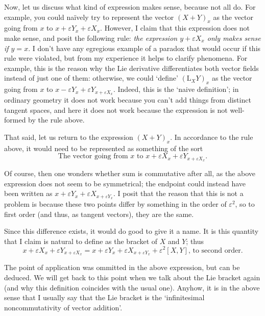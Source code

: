 \documentclass{article}
\theoremstyle{definition}
\newcommand{\Lie}{\mathrm{L}}
\begin{document}
Now, let us discuss what kind of expression makes sense, because not all do. For example, you could naïvely try to represent the vector $(X+Y)_x$ as the vector going from $x$ to $x+\varepsilon Y_x + \varepsilon X_x$. However, I claim that this expression does not make sense, and posit the following rule: \emph{the expression $y + \varepsilon X_x$ only makes sense if $y = x$}. I don't have any egregious example of a paradox that would occur if this rule were violated, but from my experience it helps to clarify phenomena. For example, this is the reason why the Lie derivative differentiates both vector fields instead of just one of them: otherwise, we could `define' $(\Lie_X Y)_x$ as the vector going from $x$ to $x - \varepsilon Y_x + \varepsilon Y_{x + \varepsilon X_x}$. Indeed, this is the `naive definition'; in ordinary geometry it does not work because you can't add things from distinct tangent spaces, and here it does not work because the expression is not well-formed by the rule above.

That said, let us return to the expression $(X+Y)_x$. In accordance to the rule above, it would need to be represented as something of the sort
\begin{equation}
\text{The vector going from } x \text{ to } x + \varepsilon X_x + \varepsilon Y_{x + \varepsilon X_x}.
\end{equation}

Of course, then one wonders whether sum is commutative after all, as the above expression does not seem to be symmetrical; the endpoint could instead have been written as $x + \varepsilon Y_x + \varepsilon X_{x + \varepsilon Y_x}$. I posit that the reason that this is not a problem is because these two points differ by something in the order of $\varepsilon^2$, so to first order (and thus, as tangent vectors), they are the same.

Since this difference exists, it would do good to give it a name. It is this quantity that I claim is natural to define as the bracket of $X$ and $Y$; thus
\begin{equation}\label{eq:bracket}
x + \varepsilon X_x + \varepsilon Y_{x + \varepsilon X_x} = x + \varepsilon Y_x + \varepsilon X_{x + \varepsilon Y_x} + \varepsilon^2 [X,Y] \text{, to second order.}
\end{equation}

The point of application was ommitted in the above expression, but can be deduced. We will get back to this point when we talk about the Lie bracket again (and why this definition coincides with the usual one). Anyhow, it is in the above sense that I usually say that the Lie bracket is the `infinitesimal noncommutativity of vector addition'.
\end{document}
